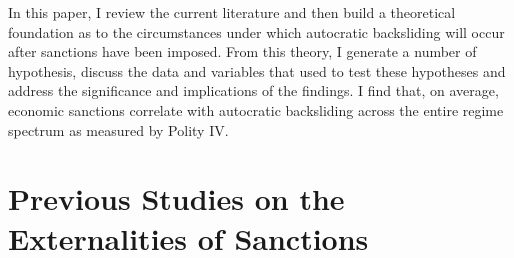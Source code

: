 \documentclass[a4paper]{article}\usepackage[]{graphicx}\usepackage[]{color}
\begin{document}
\par
In this paper, I review the current literature and then build a theoretical foundation as to the circumstances under which autocratic backsliding will occur after sanctions have been imposed. From this theory, I generate a number of hypothesis, discuss the data and variables that used to test these hypotheses and address the significance and implications of the findings. I find that, on average, economic sanctions correlate with autocratic backsliding across the entire regime spectrum as measured by Polity IV. 
\par
\section*{\large{Previous Studies on the Externalities of Sanctions}}
\end{document}
